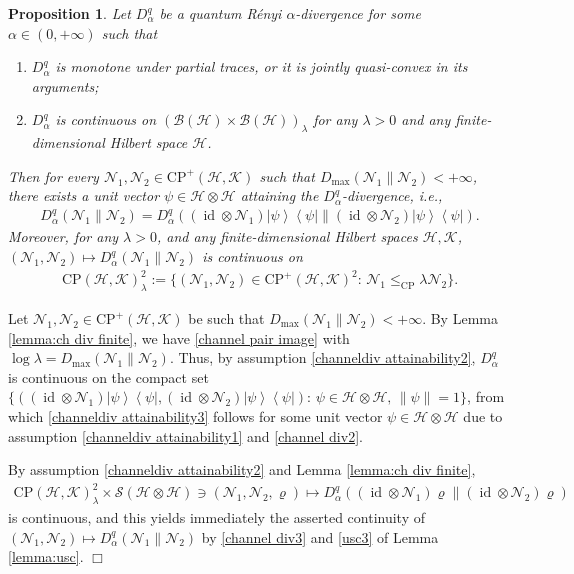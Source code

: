 \documentclass[unsortedaddress,superscriptaddress,pra,notitlepage]{revtex4}
\newtheorem{prop}[definition]{Proposition}
\newenvironment{proof}[1][Proof]{\begin{trivlist}
\item[\hskip \labelsep {\bfseries #1}]}{\hfill$\Box$\end{trivlist}}
\def\B{{\mathcal B}}
\def\N{\mathcal{N}}
\def\S{{\mathcal S}}
\def\rho{\varrho}
\def\hil{{\mathcal H}}
\def\kil{{\mathcal K}}
\def\bz{\left(}
\def\jz{\right)}
\def\CP{\mathrm{CP}}
\def\cple{\le_{\mathrm{CP}}}
\def\cpso{\text{CPSO} }
\newcommand{\norm}[1]{\left\| #1\right\|}
\newcommand{\diad}[2]{\left|#1\right\rangle\!\left\langle #2\right|}
\newcommand{\pr}[1]{\diad{#1}{#1}}
\DeclareMathOperator{\id}{id}
\begin{document}
\begin{prop}\label{prop:channeldiv attainability}
Let $D_{\alpha}^q$ be a quantum R\'enyi $\alpha$-divergence 
for some $\alpha\in(0,+\infty)$ such that 
\begin{enumerate}
\item\label{channeldiv attainability1}
$D_{\alpha}^q$ is monotone under partial traces, or it is jointly quasi-convex in its arguments;
\item\label{channeldiv attainability2}
$D_{\alpha}^q$ is continuous on $(\B(\hil)\times\B(\hil))_{\lambda}$ for any 
$\lambda>0$ and any finite-dimensional Hilbert space $\hil$. 
\end{enumerate}
Then for every $\N_1,\N_2\in\CP^+(\hil,\kil)$ such that $D_{\max}(\N_1\|\N_2)<+\infty$, there exists a unit vector $\psi\in\hil\otimes\hil$ attaining the \cpso $D_{\alpha}^q$-divergence, i.e., 
\begin{align}\label{channeldiv attainability3}
D_{\alpha}^q(\N_1\|\N_2)
=D_{\alpha}^q\bz(\id\otimes\N_1)\pr{\psi}\|(\id\otimes\N_2)\pr{\psi}\jz.
\end{align}
Moreover, for any $\lambda>0$, 
and any finite-dimensional Hilbert spaces $\hil,\kil$, 
$(\N_1,\N_2)\mapsto D_{\alpha}^q(\N_1\|\N_2)$ is continuous on 
\begin{align*}
\CP(\hil,\kil)^2_{\lambda}:=
\{(\N_1,\N_2)\in\CP^+(\hil,\kil)^2:\,\N_1\cple\lambda\N_2\}.
\end{align*}
\end{prop}
\begin{proof}
Let $\N_1,\N_2\in\CP^+(\hil,\kil)$ be such that $D_{\max}(\N_1\|\N_2)<+\infty$.
By Lemma
\ref{lemma:ch div finite}, we have \eqref{channel pair image} with 
$\log\lambda=D_{\max}(\N_1\|\N_2)$. Thus, by assumption \ref{channeldiv attainability2},
$D_{\alpha}^q$ is continuous on the compact set 
$\{((\id\otimes\N_1)\pr{\psi},(\id\otimes\N_2)\pr{\psi}):\,
\psi\in\hil\otimes\hil,\,\norm{\psi}=1\}$, from which \eqref{channeldiv attainability3} follows for some unit vector $\psi\in\hil\otimes\hil$
due to assumption \ref{channeldiv attainability1} and \eqref{channel div2}.

By assumption \ref{channeldiv attainability2} and Lemma \ref{lemma:ch div finite},
\begin{align*}
\CP(\hil,\kil)^2_{\lambda}\times\S(\hil\otimes \hil)\ni(\N_1,\N_2,\rho)\mapsto
D_{\alpha}^q\bz(\id\otimes\N_1)\rho\|(\id\otimes\N_2)\rho\jz
\end{align*}
is continuous, and this yields immediately the asserted continuity of 
$(\N_1,\N_2)\mapsto D_{\alpha}^q(\N_1\|\N_2)$  
by \eqref{channel div3} and \ref{usc3} of Lemma \ref{lemma:usc}.
\end{proof}
\end{document}
